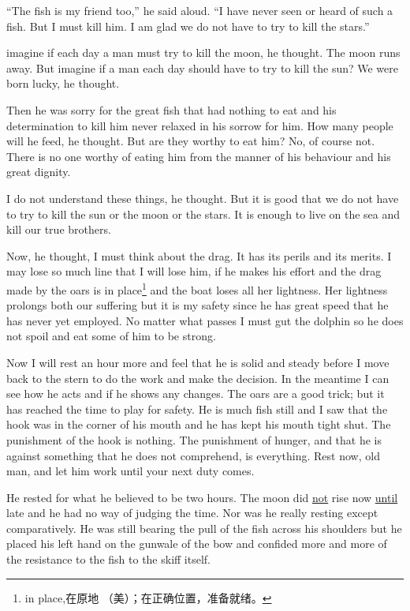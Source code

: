 \documentclass[fontset=ubuntu,zihao=-4]{ctexrep}
\begin{document}
``The fish is my friend too,'' he said aloud. ``I have never seen or heard
of such a fish. But I must kill him. I am glad we do not have to try to kill
the stars.''

\Gls{imagine} if each day a man must try to kill the moon, he thought. The moon
runs away. But imagine if a man each day should have to try to kill the sun?
We were born lucky, he thought.

Then he was sorry for the great fish that had nothing to eat and his
\gls{determination} to kill him never \gls{relaxed} in his \gls{sorrow} for
him. How many people will he feed, he thought. But are they worthy to eat
him? No, of course not. There is no one worthy of eating him from the
\gls{manner} of his \gls{behaviour} and his great \gls{dignity}.

I do not understand these things, he thought. But it is good that we do not
have to try to kill the sun or the moon or the stars. It is enough to live
on the sea and kill our true brothers.

Now, he thought, I must think about the drag. It has its \glspl{peril} and
its \glspl{merit}. I may lose so much line that I will lose him, if he makes
his effort and the drag made by the oars is in place\footnote{in place,在原地
  （美）；在正确位置，准备就绪。} and the boat loses all her
\gls{lightness}. Her lightness \glspl{prolong} both our suffering but it is
my safety since he has great speed that he has never yet \gls{employed}. No
matter what passes I must \gls{gut} the dolphin so he does not spoil
and eat some of him to be strong.

Now I will rest an hour more and feel that he is solid and steady before I
move back to the stern to do the work and make the \gls{decision}. In the
\gls{meantime} I can see how he acts and if he shows any changes. The oars
are a good trick; but it has reached the time to play for safety. He is much
fish still and I saw that the hook was in the corner of his mouth and he has
kept his mouth tight shut. The \gls{punishment} of the hook is nothing. The
punishment of hunger, and that he is against something that he does not
\gls{comprehend}, is everything. Rest now, old man, and let him work until your
next duty comes.

He rested for what he believed to be two hours. The moon did \uline{not} rise
now \uline{until} late and he had no way of \gls{judging} the time. Nor was he
really resting except \gls{comparatively}. He was still \gls{bearing} the
pull of the fish across his shoulders but he placed his left hand on the
gunwale of the bow and \gls{confided} more and more of the \gls{resistance}
to the fish to the skiff itself.
\end{document}
